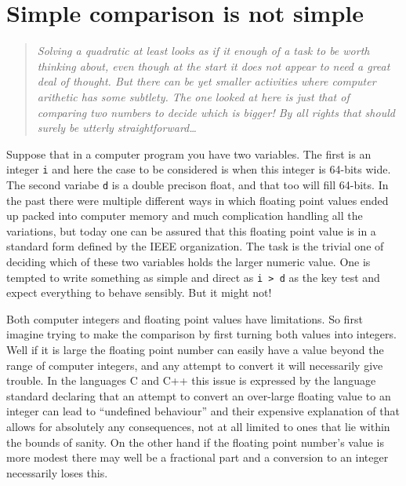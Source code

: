 \section{Simple comparison is not simple}
\begin{quotation}\textit{
Solving a quadratic at least looks as if it enough of a task to be worth
thinking about, even though at the start it does not appear to need a great
deal of thought. But there can be yet smaller activities where computer
arithetic has some subtlety. The one looked at here is just that of
comparing two numbers to decide which is bigger! By all rights that
should surely be utterly straightforward\ldots
}\end{quotation}

Suppose that in a computer program you have two variables. The first is
an integer \verb+i+ and here the case to be considered is when this
integer is 64-bits wide. The second variabe \verb+d+ is a double precison
float, and that too will fill 64-bits. In the past there were multiple
different ways in which floating point values ended up packed into
computer memory and much complication handling all the variations, but today
one can be assured that this floating point value is in a standard
form defined by the IEEE organization. The task is the trivial one of
deciding which of these two variables holds the larger numeric value.
One is tempted to write something as simple and direct as \verb+i > d+ as
the key test and expect everything to behave sensibly. But it might not!

Both computer integers and floating point values have limitations. So
first imagine trying to make the comparison by first turning both
values into integers. Well if it is large the floating point number can easily
have a value beyond the range of computer integers, and any attempt to
convert it will necessarily give trouble. In the languages C and C++ this
issue is expressed by the language standard declaring that an attempt to
convert an over-large floating value to an integer can lead to
``undefined behaviour'' and their expensive explanation of that allows
for absolutely any consequences, not at all limited to ones that lie
within the bounds of sanity. On the other hand if the floating point number's
value is more modest there may well be a fractional part and a conversion
to an integer necessarily loses this.

